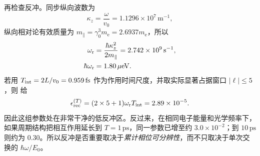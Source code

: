 \begin{exbox}
再检查反冲。同步纵向波数为
\begin{equation*}
 \kappa_z=\frac{\omega}{v_0}=1.1296\times10^7\,\mathrm{m^{-1}},
\end{equation*}
纵向相对论有效质量为 $m_\parallel=\gamma_0^3m_{\mathrm e}=2.6937m_{\mathrm e}$，所以
\begin{align*}
 \omega_{\rm r}
 &=\frac{\hbar\kappa_z^2}{2m_\parallel}
 =2.742\times10^9\,\mathrm{s^{-1}},\\
 \hbar\omega_{\rm r}
 &=1.80\,\mu\mathrm{eV}.
\end{align*}
若用 $T_{\rm int}=2L/v_0=0.959\,\mathrm{fs}$ 作为作用时间尺度，并取实际显著占据窗口 $|\ell|\le5$，则 给
\begin{equation}
 {
 \epsilon_{\rm rec}^{(T)}
 =(2\times5+1)\omega_{\rm r}T_{\rm int}
 =2.89\times10^{-5}.}
 \label{eq:pinem-gaussian-recoil-number-dp65}
\end{equation}
因此这组参数处在非常干净的低反冲区。反过来，在相同电子能量和光学频率下，如果周期结构把相互作用延长到 $T=1\,\mathrm{ps}$，同一参数已增至约 $3.0\times10^{-2}$；到 $10\,\mathrm{ps}$ 则约为 $0.30$。所以反冲是否重要取决于\emph{累计相位可分辨性}，而不只取决于单次交换的 $\hbar\omega/E_0$。
\end{exbox}
